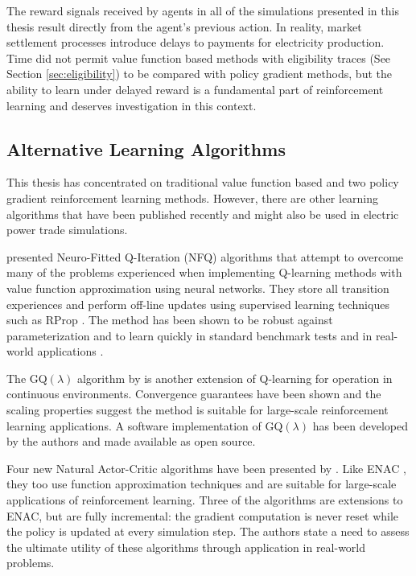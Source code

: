 The reward signals received by agents in all of the simulations presented in
this thesis result directly from the agent's previous action.  In
reality, market settlement processes introduce delays to payments for
electricity production. Time did not permit value function based methods with
eligibility traces (See Section \ref{sec:eligibility}) to be compared with
policy gradient methods, but the ability to learn under delayed reward is a
fundamental part of reinforcement learning and deserves investigation in this
context.


\subsection{Alternative Learning Algorithms}
This thesis has concentrated on traditional value function based and two policy
gradient reinforcement learning methods.  However, there are other
learning algorithms that have been published recently and might also be
used in electric power trade simulations.

 presented Neuro-Fitted Q-Iteration (NFQ) algorithms
that attempt to overcome many of the problems experienced when implementing
Q-learning methods with value function approximation using neural networks.
They store all transition experiences and perform off-line updates using
supervised learning techniques such as RProp \cite{riedmiller93}.  The method
has been shown to be robust against parameterization and to learn quickly in
standard benchmark tests and in real-world applications \cite{kietzmann09}.

The GQ$(\lambda)$ algorithm by  is another extension of Q-learning
for operation in continuous environments.  Convergence guarantees have been
shown and the scaling properties suggest the method is suitable for large-scale
reinforcement learning applications.  A software implementation of GQ$(\lambda)$
has been developed by the authors and made available as open source.

Four new Natural Actor-Critic algorithms have been presented by
. Like ENAC \cite{peters:enac}, they too use function
approximation techniques and are suitable for large-scale applications of reinforcement learning.  Three
of the algorithms are extensions to ENAC, but are fully
incremental: the gradient computation is never reset while the policy is updated
at every simulation step.  The authors state a need to assess the ultimate
utility of these algorithms through application in real-world problems.

